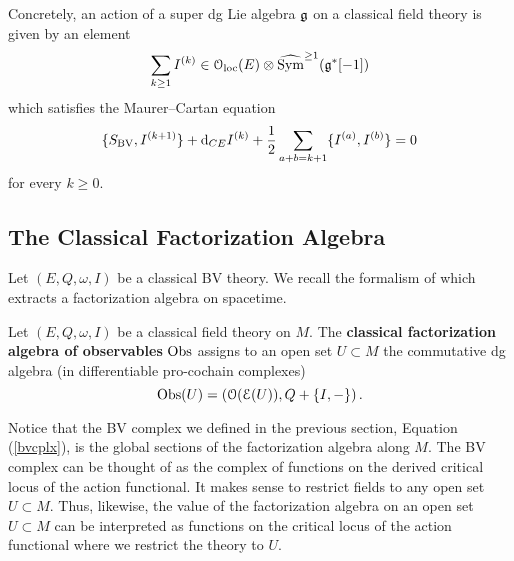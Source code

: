 \documentclass[10pt, oneside]{article}
\begin{document}
Concretely, an action of a super dg Lie algebra $\mathfrak g$ on a classical field theory is given by an element
\[\sum_{k\geq 1} I^{(k)}\in \mathcal{O}_{\rm loc}(E)\otimes \widehat{\operatorname{Sym}}^{\geq 1}(\mathfrak g^*[-1])\]
which satisfies the Maurer--Cartan equation
\[\{S_{\mathrm{BV}}, I^{(k+1)}\} + {\rm d}_{CE} I^{(k)} + \frac{1}{2}\sum_{a+b=k+1} \{I^{(a)}, I^{(b)}\} = 0\]
for every $k\geq 0$.

\begin{definition}
\end{definition}

\begin{definition}
\end{definition}


\begin{remark}
\end{remark}


\subsection{The Classical Factorization Algebra}

Let $(E, Q, \omega, I)$ be a classical BV theory. We recall the formalism of \cite{Book1,Book2} which extracts a factorization algebra on spacetime.

\begin{definition}
Let $(E, Q, \omega, I)$ be a classical field theory on $M$. The {\bf classical factorization algebra of observables} $\mathrm{Obs}$ assigns to an open set $U \subset M$ the commutative dg algebra (in differentiable pro-cochain complexes)
\[
\mathrm{Obs}(U) = \left(\mathcal O(\mathcal E(U)) , Q + \{I,-\}\right) .
\]
\end{definition}

Notice that the BV complex we defined in the previous section, Equation (\ref{bvcplx}), is the global sections of the factorization algebra along $M$.
The BV complex can be thought of as the complex of functions on the derived critical locus of the action functional.
It makes sense to restrict fields to any open set $U \subset M$. 
Thus, likewise, the value of the factorization algebra on an open set $U \subset M$ can be interpreted as functions on the critical locus of the action functional where we restrict the theory to $U$. 
\end{document}
